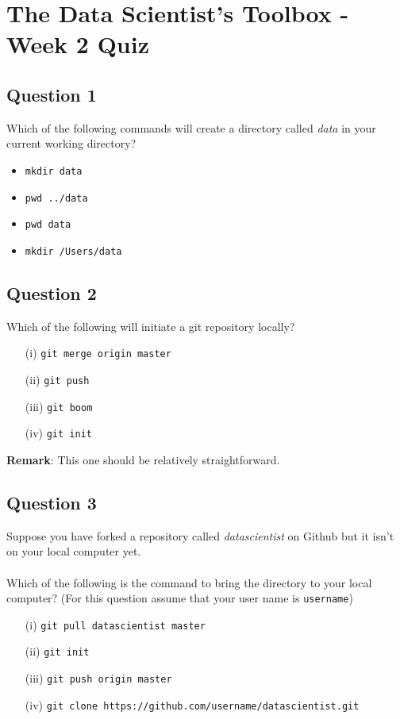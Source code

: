 \documentclass[]{article}
\begin{document}
	
\section*{The Data Scientist’s Toolbox - Week 2 Quiz}

\subsection*{Question 1}
Which of the following commands will create a directory called \textit{data} in your current working directory?
\begin{itemize}
\item \texttt{mkdir data}
\item \texttt{pwd ../data}
\item \texttt{pwd data}
\item \texttt{mkdir /Users/data}
\end{itemize}
\subsection*{Question 2}
Which of the following will initiate a git repository locally?

\begin{itemize}
\item[(i)]  \texttt{git merge origin master}
\item[(ii)]  \texttt{git push}
\item[(iii)]  \texttt{git boom}
\item[(iv)]  \texttt{git init} 
\end{itemize}

\textbf{Remark}: This one should be relatively straightforward.
\subsection*{Question 3}
Suppose you have forked a repository called \textit{datascientist} on Github but it isn't on your local computer yet. \\ \\ Which of the following is the command to bring the directory to your local computer? (For this question assume that your user name is \texttt{username})

\begin{itemize}
\item[(i)] \texttt{git pull datascientist master}
\item[(ii)] \texttt{git init}
\item[(iii)] \texttt{git push origin master}
\item[(iv)] \texttt{git clone https://github.com/username/datascientist.git}
\end{itemize}
\newpage
\end{document}
